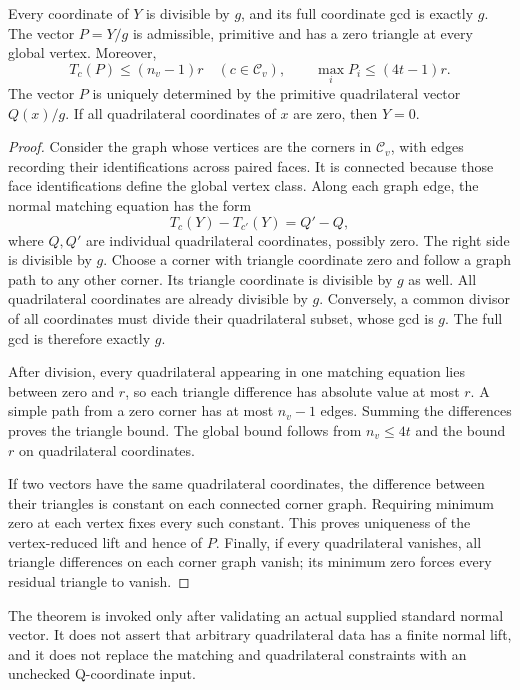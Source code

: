 \begin{theorem}
\label{thm:primitive-q-core}
Every coordinate of $Y$ is divisible by $g$, and its full coordinate gcd is
exactly $g$. The vector $P=Y/g$ is admissible, primitive and has a zero
triangle at every global vertex. Moreover,
\[
 T_c(P)\le(n_v-1)r\quad(c\in\mathcal C_v),
 \qquad \max_i P_i\le(4t-1)r.
\]
The vector $P$ is uniquely determined by the primitive quadrilateral vector
$Q(x)/g$. If all quadrilateral coordinates of $x$ are zero, then $Y=0$.
\end{theorem}
\begin{proof}
Consider the graph whose vertices are the corners in $\mathcal C_v$, with
edges recording their identifications across paired faces. It is connected
because those face identifications define the global vertex class. Along
each graph edge, the normal matching equation has the form
\[
 T_c(Y)-T_{c'}(Y)=Q'-Q,
\]
where $Q,Q'$ are individual quadrilateral coordinates, possibly zero.
The right side is divisible by $g$. Choose a corner with triangle
coordinate zero and follow a graph path to any other corner. Its triangle
coordinate is divisible by $g$ as well. All quadrilateral coordinates are
already divisible by $g$. Conversely, a common divisor of all coordinates
must divide their quadrilateral subset, whose gcd is $g$. The full gcd is
therefore exactly $g$.

After division, every quadrilateral appearing in one matching equation lies
between zero and $r$, so each triangle difference has absolute value at most
$r$. A simple path from a zero corner has at most $n_v-1$ edges. Summing the
differences proves the triangle bound. The global bound follows from
$n_v\le4t$ and the bound $r$ on quadrilateral coordinates.

If two vectors have the same quadrilateral coordinates, the difference
between their triangles is constant on each connected corner graph. Requiring
minimum zero at each vertex fixes every such constant. This proves uniqueness
of the vertex-reduced lift and hence of $P$. Finally, if every quadrilateral
vanishes, all triangle differences on each corner graph vanish; its minimum
zero forces every residual triangle to vanish.
\end{proof}

The theorem is invoked only after validating an actual supplied standard
normal vector. It does not assert that arbitrary quadrilateral data has a
finite normal lift, and it does not replace the matching and quadrilateral
constraints with an unchecked Q-coordinate input.

